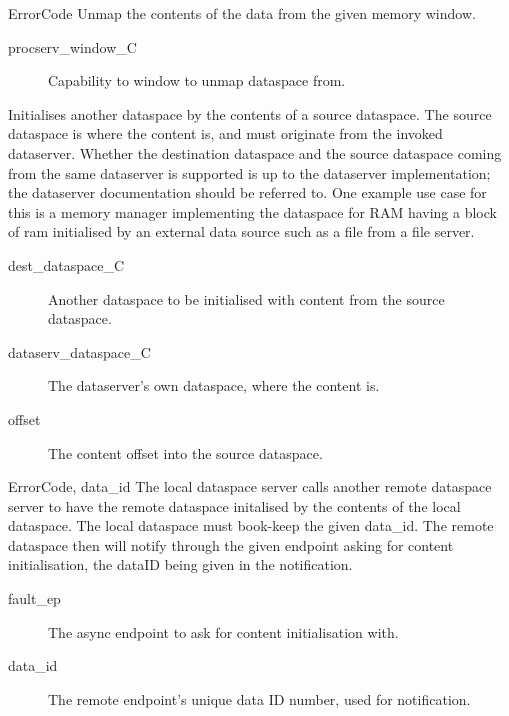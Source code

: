 \begin{description}
    \item {}
        {ErrorCode}
    Unmap the contents of the data from the given memory window.
    \begin{description}
        \item [procserv\_window\_C] Capability to window to unmap dataspace from.
    \end{description}

    \item {}
    Initialises another dataspace by the contents of a source dataspace. The source dataspace is
    where the content is, and must originate from the invoked dataserver. Whether the destination
    dataspace and the source dataspace coming from the same dataserver is supported is up to the
    dataserver implementation; the dataserver documentation should be referred to. One example use
    case for this is a memory manager implementing the dataspace for RAM having a block of ram
    initialised by an external data source such as a file from a file server.
    \begin{description}
        \item [dest\_dataspace\_C] Another dataspace to be initialised with content from the 
                                 source dataspace.
        \item [dataserv\_dataspace\_C] The dataserver's own dataspace, where the content is.
        \item [offset] The content offset into the source dataspace.
    \end{description}

    \item {}
        {ErrorCode, data\_id}
    The local dataspace server calls another remote dataspace server to have the remote dataspace
    initalised by the contents of the local dataspace. The local dataspace must book-keep the given
    data\_id. The remote dataspace then will notify through the given endpoint asking for content
    initialisation, the dataID being given in the notification.
    \begin{description}
        \item [fault\_ep] The async endpoint to ask for content initialisation with.
        \item [data\_id] The remote endpoint's unique data ID number, used for notification.
    \end{description}


\end{description}
